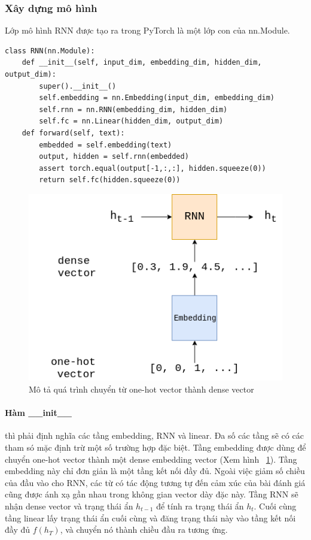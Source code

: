 \documentclass[runningheads]{llncs}
\begin{document}
\subsubsection{Xây dựng mô hình}

Lớp mô hình RNN được tạo ra trong PyTorch là một lớp con của nn.Module. 

\begin{lstlisting}
class RNN(nn.Module):
    def __init__(self, input_dim, embedding_dim, hidden_dim, output_dim):        
        super().__init__()        
        self.embedding = nn.Embedding(input_dim, embedding_dim)        
        self.rnn = nn.RNN(embedding_dim, hidden_dim)        
        self.fc = nn.Linear(hidden_dim, output_dim)        
    def forward(self, text):        
        embedded = self.embedding(text)        
        output, hidden = self.rnn(embedded)
        assert torch.equal(output[-1,:,:], hidden.squeeze(0))        
        return self.fc(hidden.squeeze(0))
\end{lstlisting}

\begin{figure}
\includegraphics[scale=0.5]{sentiment7.png}
\centering
\caption{Mô tả quá trình chuyển từ one-hot vector thành dense vector \label{figOnehotToDense}}
\end{figure}

\paragraph{Hàm \_\_init\_\_} thì phải định nghĩa các tầng embedding, RNN và linear. Đa số các tầng sẽ có các tham só mặc định trừ một số trường hợp đặc biệt.
Tầng embedding được dùng để chuyển one-hot vector thành một dense embedding vector (Xem hình ~\ref{figOnehotToDense}). Tầng embedding này chỉ đơn giản là một tầng kết nối đầy đủ. Ngoài việc giảm số chiều của đầu vào cho RNN, các từ có tác động tương tự đến cảm xúc của bài đánh giá cũng được ánh xạ gần nhau trong không gian vector dày đặc này. 
Tầng RNN sẽ nhận dense vector và trạng thái ẩn \textit{$h_{t-1}$} để tính ra trạng thái ẩn \textit{$h_{t}$}. Cuối cùng tầng linear lấy trạng thái ẩn cuối cùng và đăng trạng thái này vào tầng kết nối đầy đủ \textit{$f(h_T)$}, và chuyển nó thành chiều đầu ra tương ứng.
\end{document}
